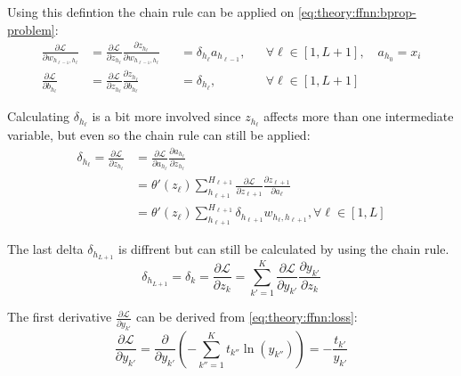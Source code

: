 Using this defintion the chain rule can be applied on \eqref{eq:theory:ffnn:bprop-problem}:
\begin{equation}
\begin{align}
\frac{\partial \mathcal{L}}{\partial w_{h_{\ell-1}, h_\ell}} &= \frac{\partial \mathcal{L}}{\partial z_{h_\ell}} \frac{\partial z_{h_\ell}}{\partial w_{h_{\ell-1}, h_\ell}} &&= \delta_{h_\ell} a_{h_{\ell-1}},&& \forall \ell \in [1, L+1],\quad a_{h_0} = x_i \\
\frac{\partial \mathcal{L}}{\partial b_{h_\ell}} &= \frac{\partial \mathcal{L}}{\partial z_{h_\ell}} \frac{\partial z_{h_\ell}}{\partial b_{h_\ell}} &&= \delta_{h_\ell},&& \forall \ell \in [1, L+1]
\end{align}
\end{equation}


Calculating $\delta_{h_\ell}$ is a bit more involved since $z_{h_\ell}$ affects more than one intermediate variable, but even so the chain rule can still be applied:
\begin{equation}
\begin{aligned}
\delta_{h_\ell} = \frac{\partial \mathcal{L}}{\partial z_{h_\ell}} &= \frac{\partial \mathcal{L}}{\partial a_{h_\ell}} \frac{\partial a_{h_\ell}}{\partial z_{h_\ell}} \\
&= \theta'(z_\ell) \sum_{h_{\ell+1}}^{H_{\ell+1}} \frac{\partial \mathcal{L}}{\partial z_{\ell+1}} \frac{\partial z_{\ell+1}}{\partial a_\ell} \\
&= \theta'(z_\ell) \sum_{h_{\ell+1}}^{H_{\ell+1}} \delta_{h_{\ell+1}} w_{h_\ell, h_{\ell+1}}, \forall \ell \in [1, L]
\end{aligned}
\label{eq:theory:ffnn:bprop}
\end{equation}

The last delta $\delta_{h_{L+1}}$ is diffrent but can still be calculated by using the chain rule.
\begin{equation}
\delta_{h_{L + 1}} = \delta_k = \frac{\partial \mathcal{L}}{\partial z_k} = \sum_{k'=1}^K \frac{\partial \mathcal{L}}{\partial y_{k'}} \frac{\partial y_{k'}}{\partial z_k}
\label{eq:theory:ffnn:bprop-deltaK}
\end{equation}

The first derivative $\frac{\partial \mathcal{L}}{\partial y_{k'}}$ can be derived from \eqref{eq:theory:ffnn:loss}:
\begin{equation}
\frac{\partial \mathcal{L}}{\partial y_{k'}} = \frac{\partial}{\partial y_{k'}} \left(- \sum_{k''=1}^K t_{k''} \ln(y_{k''})\right) = -\frac{t_{k'}}{y_{k'}}
\label{eq:theory:ffnn:bprop-Ldy}
\end{equation}

